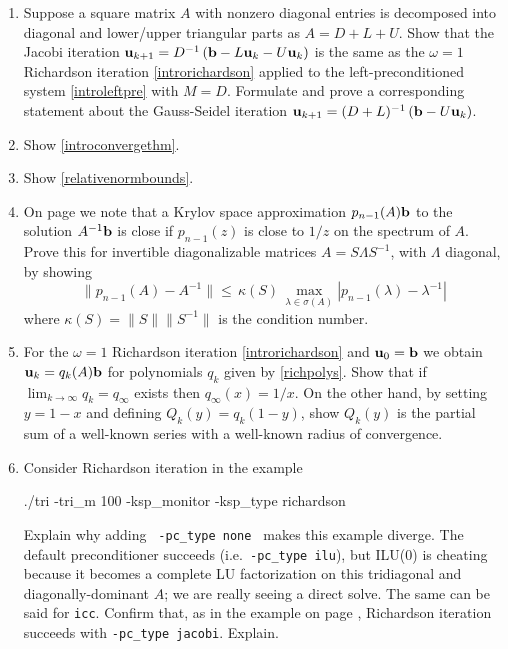 \renewcommand{\labelenumi}{\arabic{chapter}.\arabic{enumi}\quad}
\begin{enumerate}
\item \label{exer:ls:jacobirichardson}  Suppose a square matrix $A$ with nonzero diagonal entries is decomposed into diagonal and lower/upper triangular parts as $A=D+L+U$.  Show that the Jacobi iteration $\mathbf{u}_{k+1} = D^{-1} \left(\mathbf{b} - L \mathbf{u}_k - U \mathbf{u}_k\right)$ is the same as the $\omega=1$ Richardson iteration \eqref{introrichardson} applied to the left-preconditioned system \eqref{introleftpre} with $M=D$.  Formulate and prove a corresponding statement about the Gauss-Seidel iteration $\mathbf{u}_{k+1} = (D+L)^{-1} \left(\mathbf{b} - U \mathbf{u}_k\right)$.
\item \label{exer:ls:showconvergethm}  Show \eqref{introconvergethm}.

\item \label{exer:ls:errornorms}  Show \eqref{relativenormbounds}.

\item On page \pageref{eq:ls:krylovgoal} we note that a Krylov space approximation $p_{n-1}(A)\mathbf{b}$ to the solution $A^{-1}\mathbf{b}$ is close if $p_{n-1}(z)$ is close to $1/z$ on the spectrum of $A$.  Prove this for invertible diagonalizable matrices $A=S\Lambda S^{-1}$, with $\Lambda$ diagonal, by showing
	$$\|p_{n-1}(A) - A^{-1}\| \le \,\kappa(S)\, \max_{\lambda \in \sigma(A)} |p_{n-1}(\lambda) - \lambda^{-1}|$$
where $\kappa(S) = \|S\| \|S^{-1}\|$ is the condition number.

\item For the $\omega=1$ Richardson iteration \eqref{introrichardson} and $\mathbf{u}_0=\mathbf{b}$ we obtain $\mathbf{u}_k = q_k(A) \mathbf{b}$ for polynomials $q_k$ given by \eqref{richpolys}.  Show that if $\lim_{k\to\infty} q_k=q_\infty$ exists then $q_\infty(x)=1/x$.  On the other hand, by setting $y=1-x$ and defining $Q_k(y)=q_k(1-y)$, show $Q_k(y)$ is the partial sum of a well-known series with a well-known radius of convergence.

\item Consider Richardson iteration in the example
\begin{cline}
./tri -tri_m 100 -ksp_monitor -ksp_type richardson
\end{cline}
Explain why adding \texttt{ -pc\_type none } makes this example diverge.  The default preconditioner succeeds (i.e.~\texttt{-pc\_type ilu}), but ILU($0$) is cheating because it becomes a complete LU factorization on this tridiagonal and diagonally-dominant $A$; we are really seeing a direct solve.  The same can be said for \texttt{icc}.  Confirm that, as in the example on page \pageref{introprerichardson}, Richardson iteration succeeds with \texttt{-pc\_type jacobi}.  Explain.


\end{enumerate}
